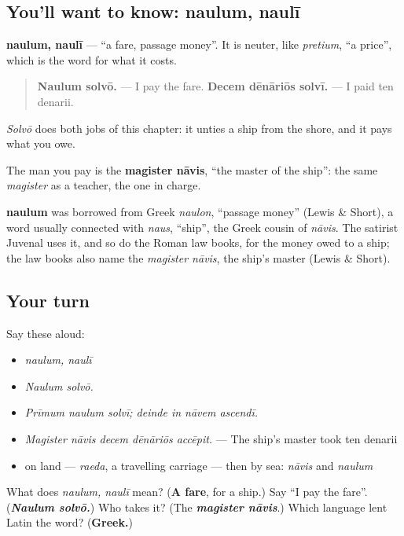 \subsection*{You'll want to know: naulum, naulī}
\textbf{naulum, naulī} — \textquotedblleft{}a fare, passage money\textquotedblright{}. It is neuter, like \emph{pretium}, \textquotedblleft{}a price\textquotedblright{}, which is the word for what it costs.

\begin{quote}
\textbf{Naulum solvō.} — I pay the fare. \textbf{Decem dēnāriōs solvī.} — I paid ten denarii.
\end{quote}

\emph{Solvō} does both jobs of this chapter: it unties a ship from the shore, and it pays what you owe.

The man you pay is the \textbf{magister nāvis}, \textquotedblleft{}the master of the ship\textquotedblright{}: the same \emph{magister} as a teacher, the one in charge.

\begin{cousinweb}
\textbf{naulum} was borrowed from Greek \emph{naulon}, \textquotedblleft{}passage money\textquotedblright{} (Lewis \& Short), a word usually connected with \emph{naus}, \textquotedblleft{}ship\textquotedblright{}, the Greek cousin of \emph{nāvis}. The satirist Juvenal uses it, and so do the Roman law books, for the money owed to a ship; the law books also name the \emph{magister nāvis}, the ship's master (Lewis \& Short).
\end{cousinweb}

\subsection*{Your turn}
Say these aloud:

\begin{itemize}
\raggedright
  \item \emph{naulum, naulī}
  \item \emph{Naulum solvō.}
  \item \emph{Prīmum naulum solvī; deinde in nāvem ascendī.}
  \item \emph{Magister nāvis decem dēnāriōs accēpit.} — The ship's master took ten denarii
  \item on land — \emph{raeda}, a travelling carriage — then by sea: \emph{nāvis} and \emph{naulum}
\end{itemize}

\begin{tcolorbox}[breakable,colback=teal!4,colframe=teal!35!black,title={Before you move on}]
What does \emph{naulum, naulī} mean? (\textbf{A fare}, for a ship.) Say \textquotedblleft{}I pay the fare\textquotedblright{}. (\emph{\textbf{Naulum solvō.}}) Who takes it? (The \emph{\textbf{magister nāvis}}.) Which language lent Latin the word? (\textbf{Greek.})
\end{tcolorbox}
